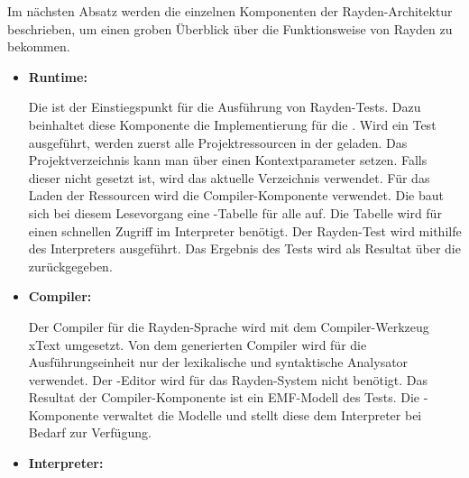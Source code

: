 \SuperPar
Im nächsten Absatz werden die einzelnen Komponenten der Rayden-Architektur beschrieben, um einen groben Überblick über die Funktionsweise von Rayden zu bekommen.\\

\begin{itemize}

\item \textbf{Runtime:}

Die  ist der Einstiegspunkt für die Ausführung von Rayden-Tests. Dazu beinhaltet diese Komponente die Implementierung für die . Wird ein Test ausgeführt, werden zuerst alle Projektressourcen in der  geladen. Das Projektverzeichnis kann man über einen Kontextparameter setzen. Falls dieser nicht gesetzt ist, wird das aktuelle Verzeichnis verwendet. Für das Laden der Ressourcen wird die Compiler-Komponente verwendet. Die  baut sich bei diesem Lesevorgang eine -Tabelle für alle  auf. Die Tabelle wird für einen schnellen Zugriff im Interpreter benötigt. Der Rayden-Test wird mithilfe des Interpreters ausgeführt. Das Ergebnis des Tests wird als Resultat über die  zurückgegeben.\\

\item \textbf{Compiler:}

Der Compiler für die Rayden-Sprache wird mit dem Compiler-Werkzeug xText\cite{xtext} umgesetzt. Von dem generierten Compiler wird für die Ausführungseinheit nur der lexikalische und syntaktische Analysator verwendet. Der -Editor wird für das Rayden-System nicht benötigt. Das Resultat der Compiler-Komponente ist ein EMF-Modell des Tests. Die -Komponente verwaltet die Modelle und stellt diese dem Interpreter bei Bedarf zur Verfügung.\\

\item \textbf{Interpreter:}


\end{itemize}
